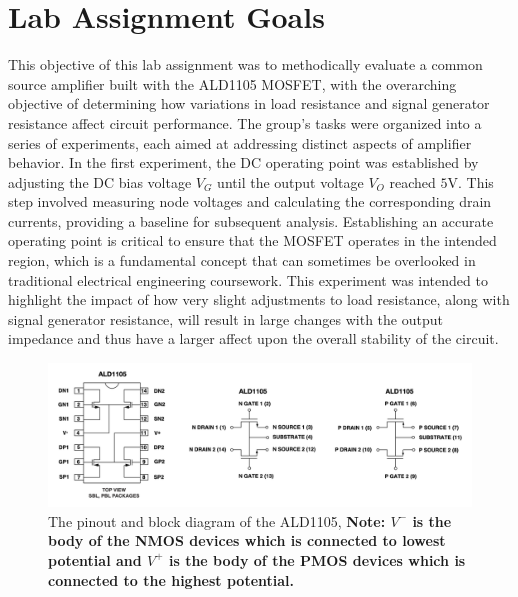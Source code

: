 

\onehalfspacing
\section{Lab Assignment Goals}
\vspace{.35cm}
\justifying 

This objective of this lab assignment was to methodically evaluate a common source amplifier built with the ALD1105 MOSFET, with the overarching objective of determining how variations in load resistance and signal generator resistance affect circuit performance. The group’s tasks were organized into a series of experiments, each aimed at addressing distinct aspects of amplifier behavior.
In the first experiment, the DC operating point was established by adjusting the DC bias voltage $V_G$ until the output voltage $V_O$ reached $5$V. This step involved measuring node voltages and calculating the corresponding drain currents, providing a baseline for subsequent analysis. Establishing an accurate operating point is critical to ensure that the MOSFET operates in the intended region, which is a fundamental concept that can sometimes be overlooked in traditional electrical engineering coursework.
This experiment was intended to highlight the impact of how very slight adjustments to load resistance, along with signal generator resistance, will result in large changes with the output impedance and thus have a larger affect upon the overall stability of the circuit. 

\vspace{.35cm}

\begin{center}
\begin{figure}[ht]
\includegraphics[scale=0.5\linewidth]{Chapter_3/Lab_03_Image_1.png}
\vspace{.55cm}
\caption{The pinout and block diagram of the ALD1105, \textbf{Note: $V^{-}$ is the body of the NMOS devices which is connected to lowest potential and $V^{+}$ is the body of the PMOS devices which is connected to the highest potential. }}
\label{Ch3_fig:1}
\end{figure}
\end{center}

